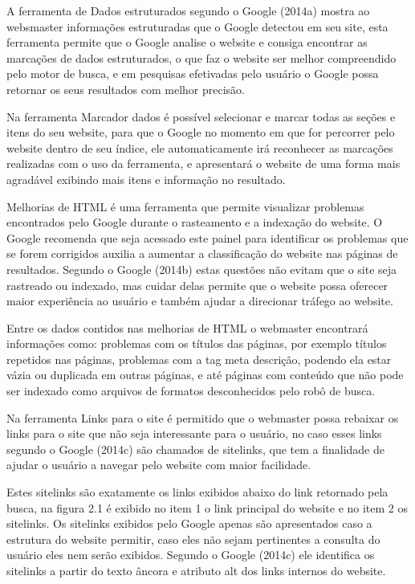 \documentclass[
	12pt,				%
	openright,			%
	twoside,			%
	a4paper,			%
	english,			%
	french,				%
	spanish,			%
	brazil				%
	]{abntex2}
\begin{document}
A ferramenta de Dados estruturados segundo o Google (2014a) mostra ao websmaster informações estruturadas que o Google detectou em seu site, esta ferramenta permite que o Google analise o website e consiga encontrar as marcações de dados estruturados, o que faz o website ser melhor compreendido pelo motor de busca, e em pesquisas efetivadas pelo usuário o Google possa retornar os seus resultados com melhor precisão.

Na ferramenta Marcador dados é possível selecionar e marcar todas as seções e itens do seu website, para que o Google no momento em que for percorrer pelo website dentro de seu índice, ele automaticamente irá reconhecer as marcações realizadas com o uso da ferramenta, e apresentará o website de uma forma mais agradável exibindo mais itens e informação no resultado.

Melhorias de HTML é  uma ferramenta que permite visualizar problemas encontrados pelo Google durante o rasteamento e a indexação do website. O Google recomenda que seja acessado este painel para identificar os problemas que se forem corrigidos auxilia a aumentar a classificação do website nas páginas de resultados. Segundo o Google (2014b) estas questões não evitam que o site seja rastreado ou indexado, mas cuidar delas permite que o website possa oferecer maior experiência ao usuário e também ajudar a direcionar tráfego ao website.

Entre os dados contidos nas melhorias de HTML o webmaster encontrará informações como: problemas com os títulos das páginas, por exemplo títulos repetidos nas páginas, problemas com a tag meta descrição, podendo ela estar vázia ou duplicada em outras páginas, e até páginas com conteúdo que não pode ser indexado como arquivos de formatos desconhecidos pelo robô de busca.

Na ferramenta Links para o site é permitido que o webmaster possa rebaixar os links para o site que não seja interessante para o usuário, no caso esses links segundo o Google (2014c) são chamados de sitelinks, que tem a finalidade de ajudar o usuário a navegar pelo website com maior facilidade.

Estes sitelinks são exatamente os links exibidos abaixo do link retornado pela busca, na figura 2.1 é exibido no item 1 o link principal do website e no item 2 os sitelinks. Os sitelinks exibidos pelo Google apenas são apresentados caso a estrutura do website permitir, caso eles não sejam pertinentes a consulta do usuário eles nem serão exibidos. Segundo o Google (2014c) ele identifica os sitelinks a partir do texto âncora e atributo alt dos links internos do website.
\end{document}
